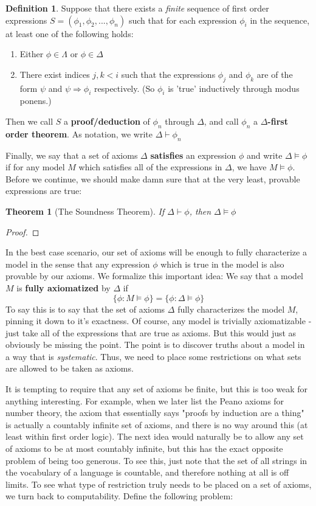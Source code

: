 \documentclass{article}
\theoremstyle{definition}
\newtheorem{definition}{Definition}[section]
\theoremstyle{plain}
\theoremstyle{theorem}
\newtheorem{theorem}{Theorem}[section]
\begin{document}
\begin{definition}
    Suppose that there exists a \textit{finite} sequence of first order expressions $S = (\phi_1,\phi_2,...,\phi_n)$ such that for each expression $\phi_i$ in the sequence, at least one of the following holds:
    \begin{enumerate}
        \item Either $\phi \in \Lambda$ or $\phi \in \Delta$
        \item There exist indices $j,k<i$ such that the expressions $\phi_j$ and $\phi_k$ are of the form $\psi$ and $\psi \Rightarrow \phi_i$ respectively. (So $\phi_i$ is 'true' inductively through modus ponens.)
    \end{enumerate}
    Then we call $S$ a \textbf{proof/deduction} of $\phi_n$ through $\Delta$, and call $\phi_n$ a \textbf{$\Delta$-first order theorem}. As notation, we write $\Delta \vdash \phi_n$
\end{definition}
Finally, we say that a set of axioms $\Delta$ \textbf{satisfies} an expression $\phi$ and write $\Delta \models \phi$ if for any model $M$ which satisfies all of the expressions in $\Delta$, we have $M \models \phi$. Before we continue, we should make damn sure that at the very least, provable expressions are true: 
\begin{theorem}[The Soundness Theorem]
    If $\Delta \vdash \phi$, then $\Delta \models \phi$
\end{theorem}
\begin{proof}
    
\end{proof}
In the best case scenario, our set of axioms will be enough to fully characterize a model in the sense that any expression $\phi$ which is true in the model is also provable by our axioms. We formalize this important idea: We say that a model $M$ is \textbf{fully axiomatized} by $\Delta$ if
\[\{\phi: M \models \phi\} = \{\phi: \Delta \models \phi\} \]
To say this is to say that the set of axioms $\Delta$ fully characterizes the model $M$, pinning it down to it's exactness. Of course, any model is trivially axiomatizable - just take all of the expressions that are true as axioms. But this would just as obviously be missing the point. The point is to discover truths about a model in a way that is \textit{systematic}. Thus, we need to place some restrictions on what sets are allowed to be taken as axioms.
\par It is tempting to require that any set of axioms be finite, but this is too weak for anything interesting. For example, when we later list the Peano axioms for number theory, the axiom that essentially says "proofs by induction are a thing" is actually a countably infinite set of axioms, and there is no way around this (at least within first order logic). The next idea would naturally be to allow any set of axioms to be at most countably infinite, but this has the exact opposite problem of being too generous. To see this, just note that the set of all strings in the vocabulary of a language is countable, and therefore nothing at all is off limits. To see what type of restriction truly needs to be placed on a set of axioms, we turn back to computability. Define the following problem:
\end{document}
